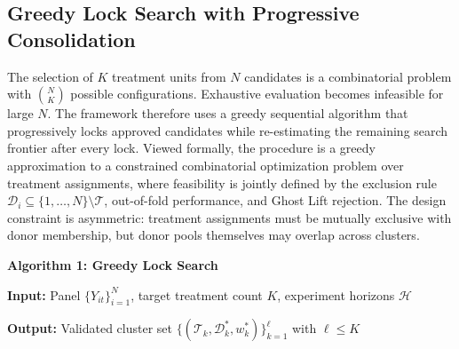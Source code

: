 \documentclass[11pt]{article}
\begin{document}
\subsection{Greedy Lock Search with Progressive Consolidation}
The selection of $K$ treatment units from $N$ candidates is a combinatorial problem with $\binom{N}{K}$ possible configurations. Exhaustive evaluation becomes infeasible for large $N$. The framework therefore uses a greedy sequential algorithm that progressively locks approved candidates while re-estimating the remaining search frontier after every lock. Viewed formally, the procedure is a greedy approximation to a constrained combinatorial optimization problem over treatment assignments, where feasibility is jointly defined by the exclusion rule $\mathcal{D}_i \subseteq \{1, \ldots, N\} \setminus \mathcal{T}$, out-of-fold performance, and Ghost Lift rejection. The design constraint is asymmetric: treatment assignments must be mutually exclusive with donor membership, but donor pools themselves may overlap across clusters.

\textbf{Algorithm 1: Greedy Lock Search}

\textbf{Input:} Panel $\{ Y_{it} \}_{i=1}^{N}$, target treatment count $K$, experiment horizons $\mathcal{H}$

\textbf{Output:} Validated cluster set $\{(\mathcal{T}_k, \mathcal{D}_k^*, w_k^*)\}_{k=1}^{\ell}$ with $\ell \leq K$
\end{document}
